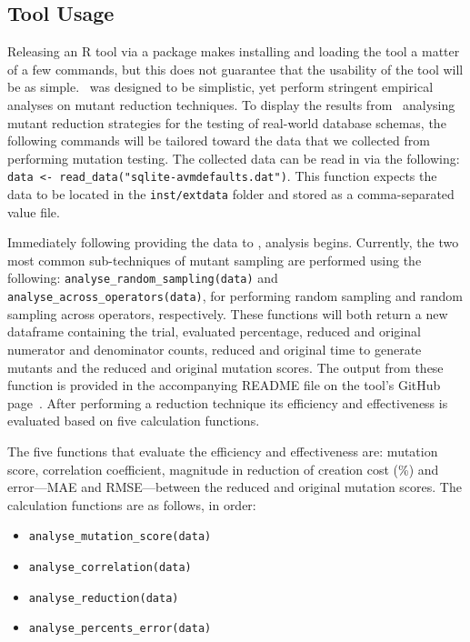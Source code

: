 \subsection{Tool Usage}

Releasing an R tool via a package makes installing and loading the tool
a matter of a few commands, but this does not guarantee that the usability
of the tool will be as simple. \mr~was designed to be simplistic,
yet perform stringent empirical analyses on mutant reduction techniques.
To display the results from \mr~analysing mutant reduction strategies for the
testing of real-world database schemas, the following commands will be tailored
toward the data that we collected from performing mutation testing.
The collected data can be read in via the following: {\small\texttt{data <- read\_data("sqlite-avmdefaults.dat")}}.
This function expects the data to be located in the \texttt{inst/extdata} folder
and stored as a comma-separated value file.

Immediately following providing the data to \mr, analysis begins. Currently,
the two most common sub-techniques of mutant sampling are performed using the following:
\texttt{analyse\_random\_sampling(data)} and \texttt{analyse\_across\_operators(data)},
for performing random sampling and random sampling across operators, respectively.
These functions will both return a new dataframe containing the trial, evaluated
percentage, reduced and original numerator and denominator counts,
reduced and original time to generate mutants and the reduced and original mutation scores.
The output from these function is provided in the accompanying README file on the
tool's GitHub page~\cite{tool}. After performing a reduction technique its efficiency
and effectiveness is evaluated based on five calculation functions.

The five functions that evaluate the efficiency and effectiveness are:
mutation score, correlation coefficient, magnitude in reduction of creation cost
(\%) and error---MAE and RMSE---between the reduced and original mutation scores.
The calculation functions are as follows, in order:

\begin{itemize}
    \item {\small\texttt{analyse\_mutation\_score(data)}}
    \item {\small\texttt{analyse\_correlation(data)}}
    \item {\small\texttt{analyse\_reduction(data)}}
    \item {\small\texttt{analyse\_percents\_error(data)}}
\end{itemize}

